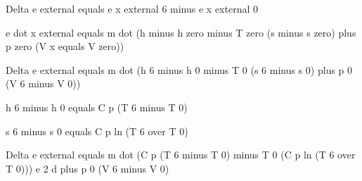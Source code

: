 Delta e external equals e x external 6 minus e x external 0

e dot x external equals m dot (h minus h zero minus T zero (s minus s zero) plus p zero (V x equals V zero))

Delta e external equals m dot (h 6 minus h 0 minus T 0 (s 6 minus s 0) plus p 0 (V 6 minus V 0))

h 6 minus h 0 equals C p (T 6 minus T 0)

s 6 minus s 0 equals C p ln (T 6 over T 0)

Delta e external equals m dot (C p (T 6 minus T 0) minus T 0 (C p ln (T 6 over T 0))) e 2 d plus p 0 (V 6 minus V 0)